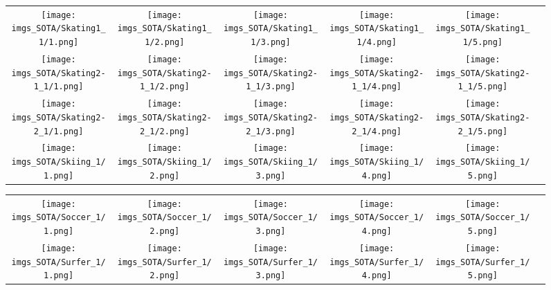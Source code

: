 \begin{figure}[H]
\begin{tabular}{@{}c@{}c@{}c@{}c@{}c@{}c@{}}
\\
\texttt{[image: imgs\_SOTA/Skating1\_1/1.png]}&
\texttt{[image: imgs\_SOTA/Skating1\_1/2.png]}&
\texttt{[image: imgs\_SOTA/Skating1\_1/3.png]}&
\texttt{[image: imgs\_SOTA/Skating1\_1/4.png]}&
\texttt{[image: imgs\_SOTA/Skating1\_1/5.png]}&
\\
\texttt{[image: imgs\_SOTA/Skating2-1\_1/1.png]}&
\texttt{[image: imgs\_SOTA/Skating2-1\_1/2.png]}&
\texttt{[image: imgs\_SOTA/Skating2-1\_1/3.png]}&
\texttt{[image: imgs\_SOTA/Skating2-1\_1/4.png]}&
\texttt{[image: imgs\_SOTA/Skating2-1\_1/5.png]}&
\\
\texttt{[image: imgs\_SOTA/Skating2-2\_1/1.png]}&
\texttt{[image: imgs\_SOTA/Skating2-2\_1/2.png]}&
\texttt{[image: imgs\_SOTA/Skating2-2\_1/3.png]}&
\texttt{[image: imgs\_SOTA/Skating2-2\_1/4.png]}&
\texttt{[image: imgs\_SOTA/Skating2-2\_1/5.png]}&
\\
\texttt{[image: imgs\_SOTA/Skiing\_1/1.png]}&
\texttt{[image: imgs\_SOTA/Skiing\_1/2.png]}&
\texttt{[image: imgs\_SOTA/Skiing\_1/3.png]}&
\texttt{[image: imgs\_SOTA/Skiing\_1/4.png]}&
\texttt{[image: imgs\_SOTA/Skiing\_1/5.png]}&
\\
\end{tabular}\end{figure}\begin{figure}[H]
\setlength{\tabcolsep}{6pt}
\renewcommand{\arraystretch}{0}
\begin{tabular}{@{}c@{}c@{}c@{}c@{}c@{}c@{}}\texttt{[image: imgs\_SOTA/Soccer\_1/1.png]}&
\texttt{[image: imgs\_SOTA/Soccer\_1/2.png]}&
\texttt{[image: imgs\_SOTA/Soccer\_1/3.png]}&
\texttt{[image: imgs\_SOTA/Soccer\_1/4.png]}&
\texttt{[image: imgs\_SOTA/Soccer\_1/5.png]}&
\\
\texttt{[image: imgs\_SOTA/Surfer\_1/1.png]}&
\texttt{[image: imgs\_SOTA/Surfer\_1/2.png]}&
\texttt{[image: imgs\_SOTA/Surfer\_1/3.png]}&
\texttt{[image: imgs\_SOTA/Surfer\_1/4.png]}&
\texttt{[image: imgs\_SOTA/Surfer\_1/5.png]}&
\\

\end{tabular}
\end{figure}
